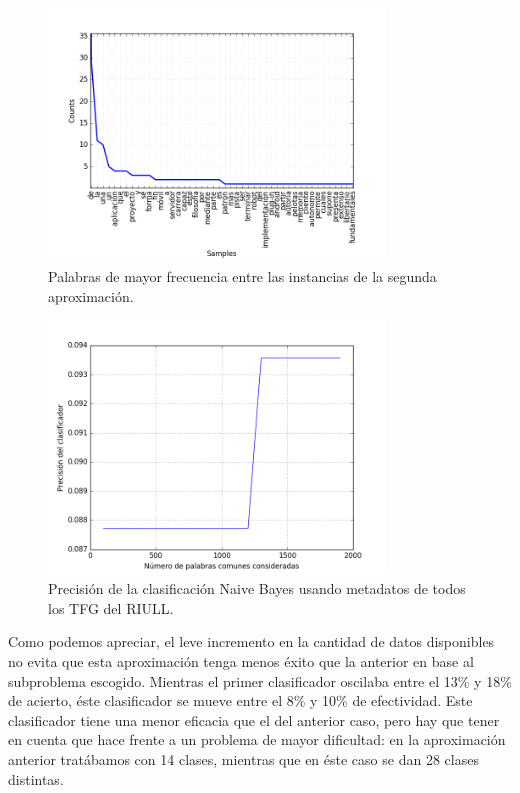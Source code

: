 \begin{center}
\begin{figure}[!ht]
  \label{fig:metadata_view}
  \centering
    \includegraphics[width=0.8\textwidth]{Images/clas2-words}
  \caption{Palabras de mayor frecuencia entre las instancias de la segunda aproximación.}
\end{figure}
\end{center}

\begin{center}
\begin{figure}[!ht]
  \label{fig:metadata_view}
  \centering
    \includegraphics[width=0.8\textwidth]{Images/clas2-precision}
  \caption{Precisión de la clasificación Naive Bayes usando metadatos de todos los TFG del RIULL.}
\end{figure}
\end{center}

Como podemos apreciar, el leve incremento en la cantidad de datos disponibles no evita que esta aproximación tenga menos éxito que la anterior en base al subproblema escogido.  Mientras el primer clasificador oscilaba entre el 13\% y 18\% de acierto, éste clasificador se mueve entre el 8\% y 10\% de efectividad.
%
Este clasificador tiene una menor eficacia que el del anterior caso, pero hay que tener en cuenta que hace frente a un problema de mayor dificultad: en la aproximación anterior tratábamos con 14 clases, mientras que en éste caso se dan 28 clases distintas.